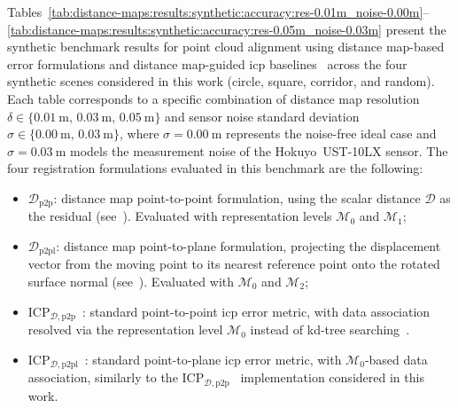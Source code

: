 Tables~\ref{tab:distance-maps:results:synthetic:accuracy:res-0.01m_noise-0.00m}--\ref{tab:distance-maps:results:synthetic:accuracy:res-0.05m_noise-0.03m}
present the synthetic benchmark results for point cloud alignment using
distance map-based error formulations and distance map-guided \gls{icp}
baselines~\cite{besl-mckay:tpami:1992,chen-medioni:icra:1991} across
the four synthetic scenes considered in this work
(circle, square, corridor, and random).
Each table corresponds to a specific combination of distance map resolution
$\delta \in \{\SI{0.01}{\metre},\,\SI{0.03}{\metre},\,\SI{0.05}{\metre}\}$
and sensor noise standard deviation
$\sigma \in \{\SI{0.00}{\metre},\,\SI{0.03}{\metre}\}$, where
$\sigma = \SI{0.00}{\metre}$ represents the noise-free ideal case and
$\sigma = \SI{0.03}{\metre}$ models the measurement noise of the
Hokuyo~UST-10LX sensor. The four registration formulations evaluated in
this benchmark are the following:
\begin{itemize}
\item $\mathcal{D}_\mathrm{p2p}$: distance map point-to-point formulation,
      using the scalar distance $\mathcal{D}$ as the residual
      (see~).
      Evaluated with representation levels $\mathcal{M}_0$ and $\mathcal{M}_1$;
\item $\mathcal{D}_\mathrm{p2pl}$: distance map point-to-plane formulation,
      projecting the displacement vector from the moving point to its
      nearest reference point onto the rotated surface normal
      (see~).
      Evaluated with $\mathcal{M}_0$ and $\mathcal{M}_2$;
\item $\mathrm{ICP}_{\mathcal{D},\mathrm{p2p}}$~\cite{besl-mckay:tpami:1992}:
      standard point-to-point \gls{icp} error metric, with data association
      resolved via the representation level $\mathcal{M}_0$ instead of
      kd-tree searching~\cite{bentley:cacm:1975}.
\item $\mathrm{ICP}_{\mathcal{D},\mathrm{p2pl}}$~\cite{chen-medioni:icra:1991}:
      standard point-to-plane \gls{icp} error metric,
      with $\mathcal{M}_0$-based data association, similarly to the
      $\mathrm{ICP}_{\mathcal{D},\mathrm{p2p}}$~\cite{besl-mckay:tpami:1992}
      implementation considered in this work.
\end{itemize}








